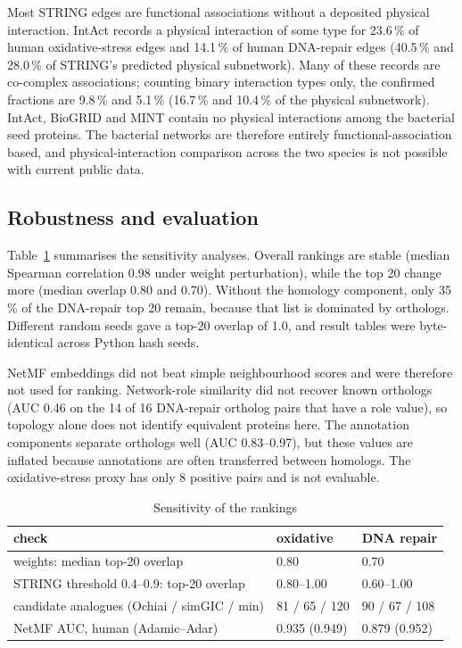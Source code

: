 \documentclass[conference]{IEEEtran}
\begin{document}
Most STRING edges are functional associations without a deposited physical interaction. IntAct
records a physical interaction of some type for 23.6\,\% of human oxidative-stress edges and
14.1\,\% of human DNA-repair edges (40.5\,\% and 28.0\,\% of STRING's predicted physical
subnetwork). Many of these records are co-complex associations; counting binary interaction types
only, the confirmed fractions are 9.8\,\% and 5.1\,\% (16.7\,\% and 10.4\,\% of the physical
subnetwork). IntAct, BioGRID and MINT contain
no physical interactions among the bacterial seed proteins. The bacterial networks are therefore
entirely functional-association based, and physical-interaction comparison across the two species
is not possible with current public data.

\subsection{Robustness and evaluation}
\label{sec:robust}

Table~\ref{tab:robustness} summarises the sensitivity analyses. Overall rankings are stable (median
Spearman correlation 0.98 under weight perturbation), while the top 20 change more (median
overlap 0.80 and 0.70). Without the
homology component, only 35\,\% of the DNA-repair top 20 remain, because that list is dominated by
orthologs. Different random seeds gave a top-20 overlap of 1.0, and result tables were
byte-identical across Python hash seeds.

NetMF embeddings did not beat simple neighbourhood scores and were therefore not used for ranking.
Network-role similarity did not recover known orthologs (AUC 0.46 on the 14 of 16 DNA-repair
ortholog pairs that have a role value), so topology alone does not identify equivalent proteins here. The annotation components separate
orthologs well (AUC 0.83--0.97), but these values are inflated because annotations are often
transferred between homologs. The oxidative-stress proxy has only 8 positive pairs and is not
evaluable.

\begin{table}[t]
\centering
\caption{Sensitivity of the rankings}
\label{tab:robustness}
\footnotesize
\setlength{\tabcolsep}{3pt}
\begin{tabular}{>{\raggedright\arraybackslash}p{3.7cm}ll}
\toprule
check & oxidative & DNA repair \\
\midrule
weights: median top-20 overlap & 0.80 & 0.70 \\
STRING threshold 0.4--0.9: top-20 overlap & 0.80--1.00 & 0.60--1.00 \\
candidate analogues (Ochiai / simGIC / min) & 81 / 65 / 120 & 90 / 67 / 108 \\
NetMF AUC, human (Adamic--Adar) & 0.935 (0.949) & 0.879 (0.952) \\
\bottomrule
\end{tabular}
\end{table}
\end{document}
